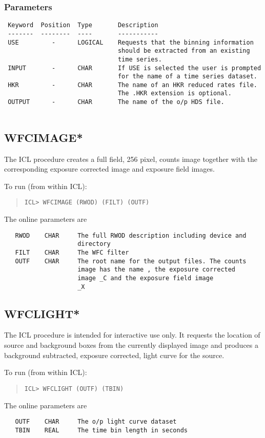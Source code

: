 \documentclass{book}
\renewcommand{\_}{{\tt\char'137}}     %
\begin{document}
\subsubsection{Parameters}
\begin{verbatim}
 Keyword  Position  Type       Description
 -------  --------  ----       -----------
 USE         -      LOGICAL    Requests that the binning information
                               should be extracted from an existing
                               time series.
 INPUT       -      CHAR       If USE is selected the user is prompted
                               for the name of a time series dataset.
 HKR         -      CHAR       The name of an HKR reduced rates file.
                               The .HKR extension is optional.
 OUTPUT      -      CHAR       The name of the o/p HDS file.
 
\end{verbatim}\subsection{WFCIMAGE*}
The ICL procedure creates a full field, 256 pixel, counts image together
with the corresponding exposure corrected image and exposure field
images.
 
To run (from within ICL):
\begin{quote}\begin{verbatim}
ICL> WFCIMAGE (RWOD) (FILT) (OUTF)
\end{verbatim}\end{quote}
The online parameters are
\begin{verbatim}
   RWOD    CHAR     The full RWOD description including device and
                    directory
   FILT    CHAR     The WFC filter
   OUTF    CHAR     The root name for the output files. The counts
                    image has the name , the exposure corrected
                    image _C and the exposure field image
                    _X
\end{verbatim}
\subsection{WFCLIGHT*}
The ICL procedure is intended for interactive use only. It requests the
location of source and background boxes from the currently displayed
image and produces a background subtracted, exposure corrected, light
curve for the source.
 
To run (from within ICL):
\begin{quote}\begin{verbatim}
ICL> WFCLIGHT (OUTF) (TBIN)
\end{verbatim}\end{quote}
The online parameters are
\begin{verbatim}
   OUTF    CHAR     The o/p light curve dataset
   TBIN    REAL     The time bin length in seconds
\end{verbatim}
\end{document}
